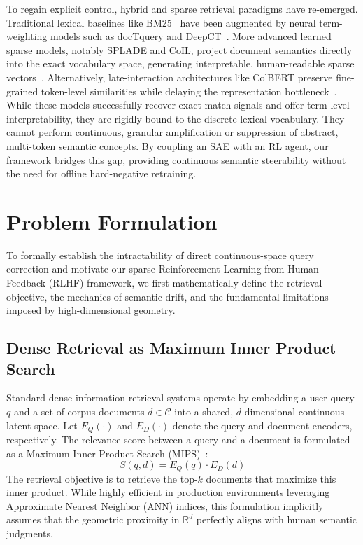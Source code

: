To regain explicit control, hybrid and sparse retrieval paradigms have re-emerged. Traditional lexical baselines like BM25~\citep{robertson1994} have been augmented by neural term-weighting models such as docTquery and DeepCT~\citep{nogueira2019, dai2019}. More advanced learned sparse models, notably SPLADE and CoIL, project document semantics directly into the exact vocabulary space, generating interpretable, human-readable sparse vectors~\citep{formal2021splade, formal2021spladev2, gao2021coil}. Alternatively, late-interaction architectures like ColBERT preserve fine-grained token-level similarities while delaying the representation bottleneck~\citep{khattab2020, santhanam2022, lin2021, luan2021}. While these models successfully recover exact-match signals and offer term-level interpretability, they are rigidly bound to the discrete lexical vocabulary. They cannot perform continuous, granular amplification or suppression of abstract, multi-token semantic concepts. By coupling an SAE with an RL agent, our framework bridges this gap, providing continuous semantic steerability without the need for offline hard-negative retraining.

\section{Problem Formulation}
To formally establish the intractability of direct continuous-space query correction and motivate our sparse Reinforcement Learning from Human Feedback (RLHF) framework, we first mathematically define the retrieval objective, the mechanics of semantic drift, and the fundamental limitations imposed by high-dimensional geometry.

\subsection{Dense Retrieval as Maximum Inner Product Search}
Standard dense information retrieval systems operate by embedding a user query $q$ and a set of corpus documents $d \in \mathcal{C}$ into a shared, $d$-dimensional continuous latent space. Let $E_Q(\cdot)$ and $E_D(\cdot)$ denote the query and document encoders, respectively. The relevance score between a query and a document is formulated as a Maximum Inner Product Search (MIPS)~\citep{johnson2019, shrivastava2014}:
\begin{equation}
S(q,d) = E_Q(q) \cdot E_D(d)
\end{equation}
The retrieval objective is to retrieve the top-$k$ documents that maximize this inner product. While highly efficient in production environments leveraging Approximate Nearest Neighbor (ANN) indices, this formulation implicitly assumes that the geometric proximity in $\mathbb{R}^d$ perfectly aligns with human semantic judgments.

